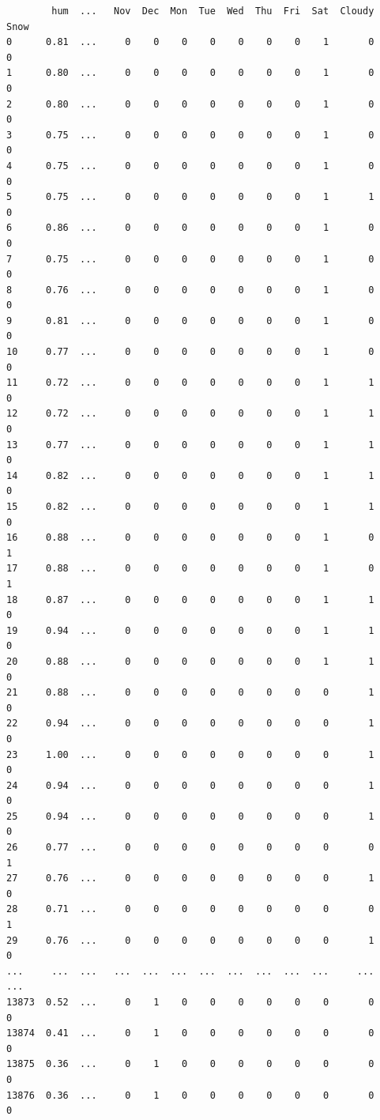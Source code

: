 \documentclass[11pt]{article}
\begin{document}
\begin{verbatim}
        hum  ...   Nov  Dec  Mon  Tue  Wed  Thu  Fri  Sat  Cloudy  Snow  
0      0.81  ...     0    0    0    0    0    0    0    1       0     0  
1      0.80  ...     0    0    0    0    0    0    0    1       0     0  
2      0.80  ...     0    0    0    0    0    0    0    1       0     0  
3      0.75  ...     0    0    0    0    0    0    0    1       0     0  
4      0.75  ...     0    0    0    0    0    0    0    1       0     0  
5      0.75  ...     0    0    0    0    0    0    0    1       1     0  
6      0.86  ...     0    0    0    0    0    0    0    1       0     0  
7      0.75  ...     0    0    0    0    0    0    0    1       0     0  
8      0.76  ...     0    0    0    0    0    0    0    1       0     0  
9      0.81  ...     0    0    0    0    0    0    0    1       0     0  
10     0.77  ...     0    0    0    0    0    0    0    1       0     0  
11     0.72  ...     0    0    0    0    0    0    0    1       1     0  
12     0.72  ...     0    0    0    0    0    0    0    1       1     0  
13     0.77  ...     0    0    0    0    0    0    0    1       1     0  
14     0.82  ...     0    0    0    0    0    0    0    1       1     0  
15     0.82  ...     0    0    0    0    0    0    0    1       1     0  
16     0.88  ...     0    0    0    0    0    0    0    1       0     1  
17     0.88  ...     0    0    0    0    0    0    0    1       0     1  
18     0.87  ...     0    0    0    0    0    0    0    1       1     0  
19     0.94  ...     0    0    0    0    0    0    0    1       1     0  
20     0.88  ...     0    0    0    0    0    0    0    1       1     0  
21     0.88  ...     0    0    0    0    0    0    0    0       1     0  
22     0.94  ...     0    0    0    0    0    0    0    0       1     0  
23     1.00  ...     0    0    0    0    0    0    0    0       1     0  
24     0.94  ...     0    0    0    0    0    0    0    0       1     0  
25     0.94  ...     0    0    0    0    0    0    0    0       1     0  
26     0.77  ...     0    0    0    0    0    0    0    0       0     1  
27     0.76  ...     0    0    0    0    0    0    0    0       1     0  
28     0.71  ...     0    0    0    0    0    0    0    0       0     1  
29     0.76  ...     0    0    0    0    0    0    0    0       1     0  
...     ...  ...   ...  ...  ...  ...  ...  ...  ...  ...     ...   ...  
13873  0.52  ...     0    1    0    0    0    0    0    0       0     0  
13874  0.41  ...     0    1    0    0    0    0    0    0       0     0  
13875  0.36  ...     0    1    0    0    0    0    0    0       0     0  
13876  0.36  ...     0    1    0    0    0    0    0    0       0     0  

\end{verbatim}
\end{document}
